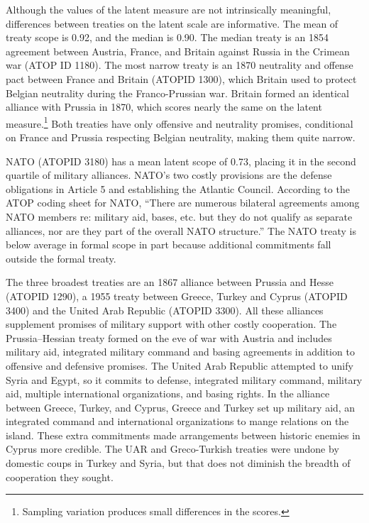 \documentclass[12pt]{article}
\begin{document}
Although the values of the latent measure are not intrinsically meaningful, differences between treaties on the latent scale are informative. 
The mean of treaty scope is 0.92, and the median is 0.90. 
The median treaty is an 1854 agreement between Austria, France, and Britain against Russia in the Crimean war (ATOP ID 1180). 
The most narrow treaty is an 1870 neutrality and offense pact between France and Britain (ATOPID 1300), which Britain used to protect Belgian neutrality during the Franco-Prussian war.  
Britain formed an identical alliance with Prussia in 1870, which scores nearly the same on the latent measure.\footnote{
Sampling variation produces small differences in the scores.} 
Both treaties have only offensive and neutrality promises, conditional on France and Prussia respecting Belgian neutrality, making them quite narrow. 


NATO (ATOPID 3180) has a mean latent scope of 0.73, placing it in the second quartile of military alliances. 
NATO's two costly provisions are the defense obligations in Article 5 and establishing the Atlantic Council. 
According to the ATOP coding sheet for NATO, ``There are numerous bilateral agreements among NATO members re: military aid, bases, etc. but they do not qualify as separate alliances, nor are they part of the overall NATO structure.''
The NATO treaty is below average in formal scope in part because additional commitments fall outside the formal treaty.    


The three broadest treaties are an 1867 alliance between Prussia and Hesse (ATOPID 1290), a 1955 treaty between Greece, Turkey and Cyprus (ATOPID 3400) and the United Arab Republic (ATOPID 3300).  
All these alliances supplement promises of military support with other costly cooperation. 
The Prussia--Hessian treaty formed on the eve of war with Austria and includes military aid, integrated military command and basing agreements in addition to offensive and defensive promises. 
The United Arab Republic attempted to unify Syria and Egypt, so it commits to defense, integrated military command, military aid, multiple international organizations, and basing rights. 
In the alliance between Greece, Turkey, and Cyprus, Greece and Turkey set up military aid, an integrated command and international organizations to mange relations on the island.
These extra commitments made arrangements between historic enemies in Cyprus more credible. 
The UAR and Greco-Turkish treaties were undone by domestic coups in Turkey and Syria, but that does not diminish the breadth of cooperation they sought. 
\end{document}
